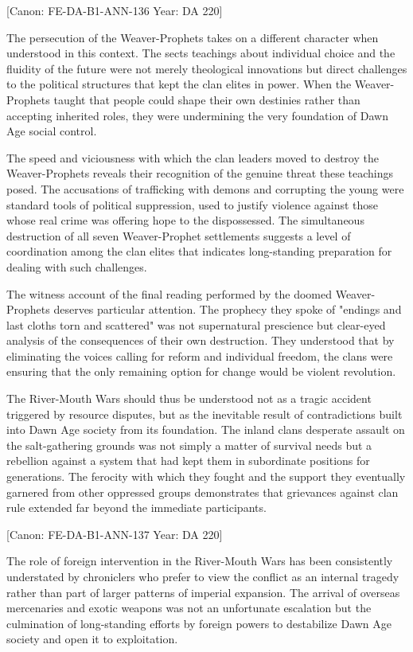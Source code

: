 {[}Canon: FE-DA-B1-ANN-136 \textbar{} Year: DA 220{]}

The persecution of the Weaver-Prophets takes on a different character
when understood in this context. The sect\textquotesingle s teachings
about individual choice and the fluidity of the future were not merely
theological innovations but direct challenges to the political
structures that kept the clan elites in power. When the Weaver-Prophets
taught that people could shape their own destinies rather than accepting
inherited roles, they were undermining the very foundation of Dawn Age
social control.

The speed and viciousness with which the clan leaders moved to destroy
the Weaver-Prophets reveals their recognition of the genuine threat
these teachings posed. The accusations of trafficking with demons and
corrupting the young were standard tools of political suppression, used
to justify violence against those whose real crime was offering hope to
the dispossessed. The simultaneous destruction of all seven
Weaver-Prophet settlements suggests a level of coordination among the
clan elites that indicates long-standing preparation for dealing with
such challenges.

The witness account of the final reading performed by the doomed
Weaver-Prophets deserves particular attention. The prophecy they spoke
of "endings and last cloths torn and scattered" was not supernatural
prescience but clear-eyed analysis of the consequences of their own
destruction. They understood that by eliminating the voices calling for
reform and individual freedom, the clans were ensuring that the only
remaining option for change would be violent revolution.

The River-Mouth Wars should thus be understood not as a tragic accident
triggered by resource disputes, but as the inevitable result of
contradictions built into Dawn Age society from its foundation. The
inland clans\textquotesingle{} desperate assault on the salt-gathering
grounds was not simply a matter of survival needs but a rebellion
against a system that had kept them in subordinate positions for
generations. The ferocity with which they fought and the support they
eventually garnered from other oppressed groups demonstrates that
grievances against clan rule extended far beyond the immediate
participants.

{[}Canon: FE-DA-B1-ANN-137 \textbar{} Year: DA 220{]}

The role of foreign intervention in the River-Mouth Wars has been
consistently understated by chroniclers who prefer to view the conflict
as an internal tragedy rather than part of larger patterns of imperial
expansion. The arrival of overseas mercenaries and exotic weapons was
not an unfortunate escalation but the culmination of long-standing
efforts by foreign powers to destabilize Dawn Age society and open it to
exploitation.

